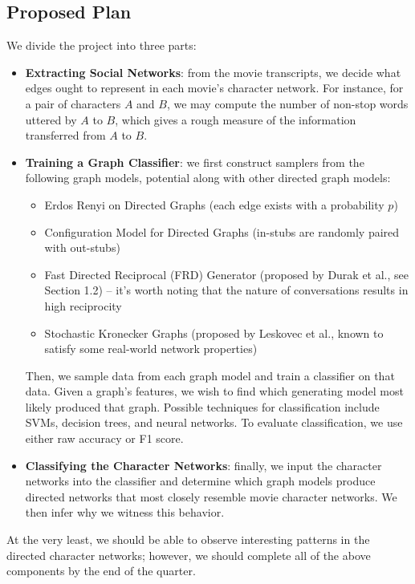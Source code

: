\documentclass{article}
\begin{document}
\subsection{Proposed Plan}
We divide the project into three parts:
\begin{itemize}
	\item \textbf{Extracting Social Networks}: from the movie transcripts, we decide what edges ought to represent in each movie's character network. For instance, for a pair of characters $A$ and $B$, we may compute the number of non-stop words uttered by $A$ to $B$, which gives a rough measure of the information transferred from $A$ to $B$.
	\item \textbf{Training a Graph Classifier}: we first construct samplers from the following graph models, potential along with other directed graph models:
	\begin{itemize}
		\item Erdos Renyi on Directed Graphs (each edge exists with a probability $p$)
		\item Configuration Model for Directed Graphs (in-stubs are randomly paired with out-stubs)
		\item Fast Directed Reciprocal (FRD) Generator (proposed by Durak et al., see Section 1.2) -- it's worth noting that the nature of conversations results in high reciprocity
		\item Stochastic Kronecker Graphs (proposed by Leskovec et al., known to satisfy some real-world network properties)
	\end{itemize}
	Then, we sample data from each graph model and train a classifier on that data. Given a graph's features, we wish to find which generating model most likely produced that graph. Possible techniques for classification include SVMs, decision trees, and neural networks. To evaluate classification, we use either raw accuracy or F1 score.
	\item \textbf{Classifying the Character Networks}: finally, we input the character networks into the classifier and determine which graph models produce directed networks that most closely resemble movie character networks. We then infer why we witness this behavior.
\end{itemize}
At the very least, we should be able to observe interesting patterns in the directed character networks; however, we should complete all of the above components by the end of the quarter.
\end{document}
